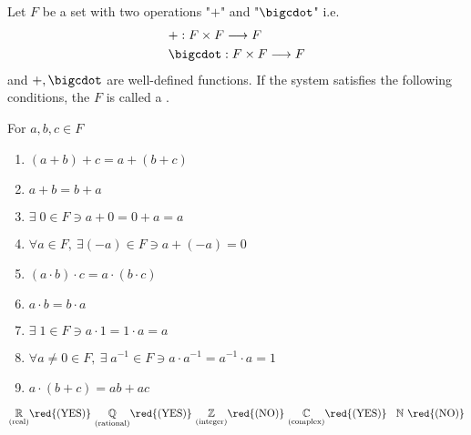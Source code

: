 \begin{definition}[Field]
    Let $F$ be a set with two operations "$+$" and "$\bigcdot$" 
    i.e. \begin{align*}
        &+ : F \times F \longrightarrow F \\
        &\bigcdot : F \times F \longrightarrow F
    \end{align*}
    and $+, \bigcdot$ are well-defined functions. If the system  satisfies the following conditions, the $F$ is called a .

    For $a,b,c \in F$

    \begin{enumerate}[label=(\arabic*)]
        \item $(a + b) + c = a + (b+c)$
        \item $a + b = b + a$
        \item $\exists \; 0 \in F \ni a + 0 = 0 + a = a$ \hspace{1em} 
        \item $\forall a \in F, \ \exists (-a) \in F \ni a + (-a) = 0$ \hspace{1em} 
        \item $(a \cdot b) \cdot c = a \cdot (b \cdot c)$
        \item  $a \cdot b = b \cdot a$
        \item $\exists\; 1 \in F \ni a \cdot 1 = 1 \cdot a = a$ \hspace{1em} 
        \item $\forall a \neq 0 \in F, \ \exists \; a^{-1} \in F \ni a \cdot a^{-1} = a^{-1} \cdot a = 1$ \hspace{1em} 
        \item $a \cdot (b + c) = ab + ac$ \hspace{1em} 
    \end{enumerate}

\end{definition}

\begin{eg}
    \[
        \underset{\text{(real)}}{\mathbb{R}} \red{\text{(YES)}} \ 
        \underset{\text{(rational)}}{\mathbb{Q}}\red{\text{(YES)}} \ \underset{\text{(integer)}}{\mathbb{Z}} \red{\text{(NO)}} \ 
        \underset{\text{(complex)}}{\mathbb{C}} \red{\text{(YES)}} \ \; \;  \mathbb{N} \ \red{\text{(NO)}}
    \]
\end{eg}

